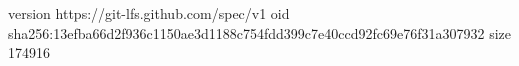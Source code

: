version https://git-lfs.github.com/spec/v1
oid sha256:13efba66d2f936c1150ae3d1188c754fdd399c7e40ccd92fc69e76f31a307932
size 174916
